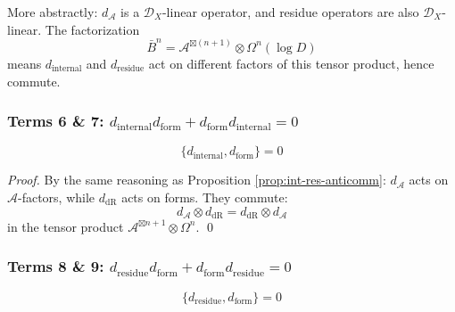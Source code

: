\begin{remark}
More abstractly: $d_{\mathcal{A}}$ is a $\mathcal{D}_X$-linear operator, and residue
operators are also $\mathcal{D}_X$-linear. The factorization
$$\bar{B}^n = \mathcal{A}^{\boxtimes (n+1)} \otimes \Omega^n(\log D)$$
means $d_{\text{internal}}$ and $d_{\text{residue}}$ act on different factors of this
tensor product, hence commute.
\end{remark}

\subsubsection{Terms 6 \& 7: $d_{\text{internal}} d_{\text{form}} + d_{\text{form}} 
d_{\text{internal}} = 0$}

\begin{proposition}\label{prop:int-form-anticomm}
$$\{d_{\text{internal}}, d_{\text{form}}\} = 0$$
\end{proposition}

\begin{proof}
By the same reasoning as Proposition \ref{prop:int-res-anticomm}:
$d_{\mathcal{A}}$ acts on $\mathcal{A}$-factors, while $d_{\text{dR}}$ acts on forms.
They commute:
$$d_{\mathcal{A}} \otimes d_{\text{dR}} = d_{\text{dR}} \otimes d_{\mathcal{A}}$$
in the tensor product $\mathcal{A}^{\boxtimes n+1} \otimes \Omega^n$.
\qed
\end{proof}

\subsubsection{Terms 8 \& 9: $d_{\text{residue}} d_{\text{form}} + d_{\text{form}} 
d_{\text{residue}} = 0$}

\begin{proposition}\label{prop:res-form-anticomm}
$$\{d_{\text{residue}}, d_{\text{form}}\} = 0$$
\end{proposition}

